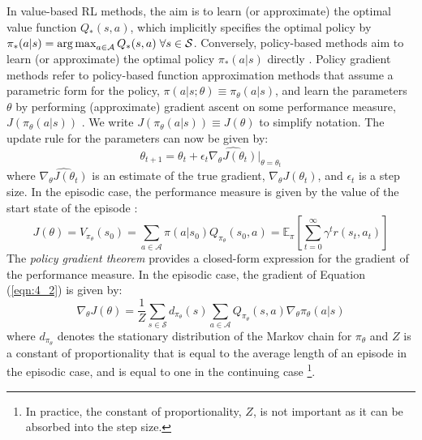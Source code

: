 In value-based RL methods, the aim is to learn (or approximate) the optimal value function $Q_*(s, a)$, which implicitly specifies the optimal policy by $\pi_*(a|s) = \operatorname*{arg\,max}_{a \in \mathcal{A}} Q_*(s, a) \hspace{0.1cm} \forall s \in \mathcal{S}$. Conversely, policy-based methods aim to learn (or approximate) the optimal policy $\pi_*(a|s)$ directly \citep{mnih_asynchronous}. Policy gradient methods refer to policy-based function approximation methods that assume a parametric form for the policy, $\pi(a|s;\theta)\equiv \pi_{\theta}(a|s)$, and learn the parameters $\theta$ by performing (approximate) gradient ascent on some performance measure, $J(\pi_{\theta}(a|s))$ \citep{sb}. We write $J(\pi_{\theta}(a|s)) \equiv J(\theta)$ to simplify notation. The update rule for the parameters can now be given by:
\renewcommand{\theequation}{4.1}
\begin{equation}
\theta_{t+1} = \theta_t + \epsilon_t \widehat{\nabla_{\theta}J(\theta_t)}\big|_{\theta=\theta_t}
\end{equation}
where $\widehat{\nabla_{\theta}J(\theta_t)}$ is an estimate of the true gradient, $\nabla_{\theta}J(\theta_t)$, and $\epsilon_t$ is a step size.
In the episodic case, the performance measure is given by the value of the start state of the episode \citep{sb}:
\renewcommand{\theequation}{4.2}
\begin{equation}
\label{eqn:4_2}
J(\theta) = V_{\pi_{\theta}}(s_0) = \sum_{a \in \mathcal{A}} \pi(a|s_0) Q_{\pi_{\theta}}(s_0, a) = \mathbb{E}_{\pi}\left[\sum_{t=0}^{\infty}\gamma^t r(s_t, a_t)\right]
\end{equation}
The \textit{policy gradient theorem} \citep{sutton_policy_gradient} provides a closed-form expression for the gradient of the performance measure. In the episodic case, the gradient of Equation (\ref{eqn:4_2}) is given by:
\renewcommand{\theequation}{4.3}
\begin{equation}
\label{eqn:policy_gradient}
\nabla_{\theta} J(\theta) = \frac{1}{Z}\sum_{s \in \mathcal{S}} d_{\pi_\theta}(s) \sum_{a \in \mathcal{A}} Q_{\pi_{\theta}}(s, a) \nabla_\theta \pi_{\theta}(a|s)
\end{equation}
where $d_{\pi_{\theta}}$ denotes the stationary distribution of the Markov chain for $\pi_{\theta}$ and $Z$ is a constant of proportionality that is equal to the average length of an episode in the episodic case, and is equal to one in the continuing case \citep{sb} \footnote{In practice, the constant of proportionality, $Z$, is not important as it can be absorbed into the step size.}.


